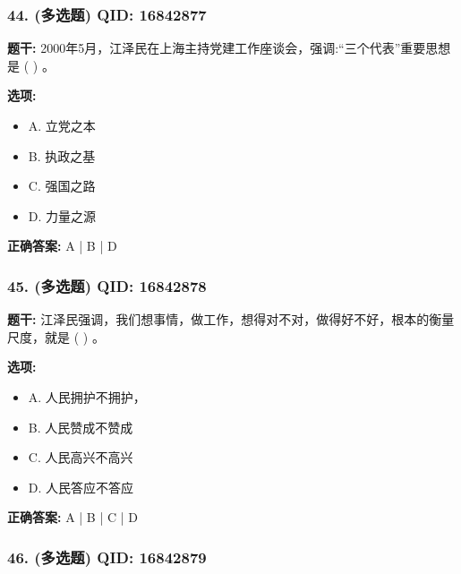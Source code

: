 \documentclass[12pt,UTF8]{ctexart}
\begin{document}
\subsubsection*{44. (多选题) \small QID: 16842877}

\textbf{题干:}
2000年5月，江泽民在上海主持党建工作座谈会，强调:“三个代表”重要思想是 ( ) 。

\textbf{选项:}
\begin{itemize}[leftmargin=*]

  \item A. 立党之本

  \item B. 执政之基

  \item C. 强国之路

  \item D. 力量之源

\end{itemize}

\textbf{正确答案:}
A | B | D

\vspace{0.3em}\hrulefill\vspace{0.7em}

\subsubsection*{45. (多选题) \small QID: 16842878}

\textbf{题干:}
江泽民强调，我们想事情，做工作，想得对不对，做得好不好，根本的衡量尺度，就是 ( ) 。

\textbf{选项:}
\begin{itemize}[leftmargin=*]

  \item A. 人民拥护不拥护，

  \item B. 人民赞成不赞成

  \item C. 人民高兴不高兴

  \item D. 人民答应不答应

\end{itemize}

\textbf{正确答案:}
A | B | C | D

\vspace{0.3em}\hrulefill\vspace{0.7em}

\subsubsection*{46. (多选题) \small QID: 16842879}
\end{document}
